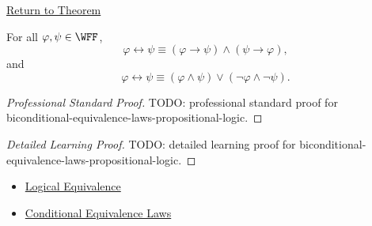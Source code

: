\newpage
{}
\label{prf:biconditional-equivalence-laws-propositional-logic}

\begin{remark*}[Return]
\hyperref[thm:biconditional-equivalence-laws-propositional-logic]{Return to Theorem}
\end{remark*}

\begin{theorem*}
For all \(\varphi,\psi\in\WFF\),
\[
\varphi\leftrightarrow\psi
\equiv
(\varphi\to\psi)\land(\psi\to\varphi),
\]
and
\[
\varphi\leftrightarrow\psi
\equiv
(\varphi\land\psi)\lor(\neg\varphi\land\neg\psi).
\]
\end{theorem*}

\begin{proof}[Professional Standard Proof]
\LRAProofBodyStart
TODO: professional standard proof for biconditional-equivalence-laws-propositional-logic.
\end{proof}

\begin{proof}[Detailed Learning Proof]
\LRAProofBodyStart
TODO: detailed learning proof for biconditional-equivalence-laws-propositional-logic.
\end{proof}

\begin{remark*}
\end{remark*}

\begin{dependencies}
\begin{itemize}
  \item \hyperref[def:logical-equivalence-propositional-logic]{Logical Equivalence}
  \item \hyperref[thm:conditional-equivalence-laws-propositional-logic]{Conditional Equivalence Laws}
\end{itemize}
\end{dependencies}

\clearpage
